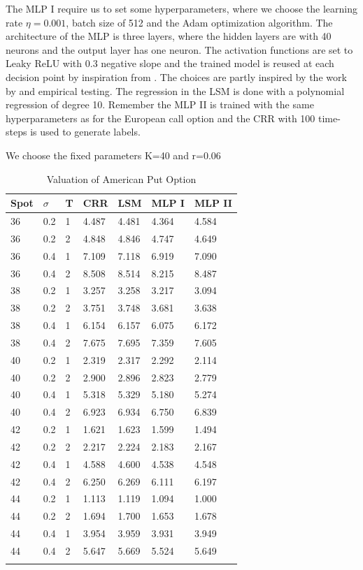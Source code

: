 The MLP I require us to set some hyperparameters, where we choose the learning rate $\eta=0.001$, batch size of 512 and the Adam optimization algorithm. The architecture of the MLP is three layers, where the hidden layers are with 40 neurons and the output layer has one neuron. The activation functions are set to Leaky ReLU with 0.3 negative slope and the trained model is reused at each decision point by inspiration from \parencite{Lelong19}. The choices are partly inspired by the work by \parencite{Lelong19} and empirical testing. The regression in the LSM is done with a polynomial regression of degree 10. Remember the MLP II is trained with the same hyperparameters as for the European call option and the CRR with 100 time-steps is used to generate labels.\\

\begin{table}[th]
\caption{Valuation of American Put Option}{We choose the fixed parameters K=40 and r=0.06}
\label{tab:AmericanPut}
\centering
\begin{tabular}{l l l l l l l }
\toprule
\textbf{Spot} & \textbf{$\sigma$} & \textbf{T} & \textbf{CRR} & \textbf{LSM} & \textbf{MLP I} & \textbf{MLP II} \\
\midrule
36 & 0.2 & 1 & 4.487 & 4.481 & 4.364 & 4.584\\
36 & 0.2 & 2 & 4.848 & 4.846 & 4.747 & 4.649\\
36 & 0.4 & 1 & 7.109 & 7.118 & 6.919 & 7.090\\
36 & 0.4 & 2 & 8.508 & 8.514 & 8.215 & 8.487\\
38 & 0.2 & 1 & 3.257 & 3.258 & 3.217 & 3.094\\
38 & 0.2 & 2 & 3.751 & 3.748 & 3.681 & 3.638\\
38 & 0.4 & 1 & 6.154 & 6.157 & 6.075 & 6.172\\
38 & 0.4 & 2 & 7.675 & 7.695 & 7.359 & 7.605\\
40 & 0.2 & 1 & 2.319 & 2.317 & 2.292 & 2.114\\
40 & 0.2 & 2 & 2.900 & 2.896 & 2.823 & 2.779\\
40 & 0.4 & 1 & 5.318 & 5.329 & 5.180 & 5.274\\
40 & 0.4 & 2 & 6.923 & 6.934 & 6.750 & 6.839\\
42 & 0.2 & 1 & 1.621 & 1.623 & 1.599 & 1.494\\
42 & 0.2 & 2 & 2.217 & 2.224 & 2.183 & 2.167\\
42 & 0.4 & 1 & 4.588 & 4.600 & 4.538 & 4.548\\
42 & 0.4 & 2 & 6.250 & 6.269 & 6.111 & 6.197\\
44 & 0.2 & 1 & 1.113 & 1.119 & 1.094 & 1.000\\
44 & 0.2 & 2 & 1.694 & 1.700 & 1.653 & 1.678\\
44 & 0.4 & 1 & 3.954 & 3.959 & 3.931 & 3.949\\
44 & 0.4 & 2 & 5.647 & 5.669 & 5.524 & 5.649\\
\bottomrule\\
\end{tabular}
\end{table}

